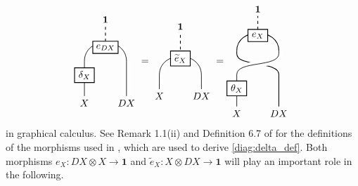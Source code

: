 \documentclass[11pt, reqno]{amsart}
\theoremstyle{definition}\newtheorem{defi}[thm]{Definition}
\theoremstyle{definition}\newtheorem{rem}[thm]{Remark}
\theoremstyle{definition}\newtheorem{exam}[thm]{Example}
\theoremstyle{definition}\newtheorem{assum}[thm]{Assumption}
\newcommand{\til}{\widetilde}
\newcommand{\vac}{\mathbf{1}}
\begin{document}
 \begin{equation*}
 \begin{matrix}
    \begin{tikzpicture}[scale = 1, baseline = {(current bounding box.center)}, line width=0.75pt] 
    \draw[white, double=black, line width = 3pt ] (0,0) -- (0,1.25) .. controls (0,2.15) and (1.5,2.15) .. (1.5,1.25) -- (1.5,0);
    \draw[dashed] (.75,1.75) -- (.75,2.5);
    \node at (0,-.25) {$X$};
    \node at (1.5,-.25) {$DX$};
    \node at (.75,2.75) {$\vac$};
    \node at (0,.75) [draw,minimum width=20pt,minimum height=10pt,thick, fill=white] {$\delta_X$};
    \node at (.75,1.75) [draw,minimum width=20pt,minimum height=10pt,thick, fill=white] {$e_{DX}$};
    \end{tikzpicture}
   \end{matrix} =
   \begin{matrix}
    \begin{tikzpicture}[scale = 1, baseline = {(current bounding box.center)}, line width=0.75pt] 
    \draw[white, double=black, line width = 3pt ] (0,0) -- (0,.5) .. controls (0,1.4) and (1.5,1.4) .. (1.5,.5) -- (1.5,0);
    \draw[dashed] (.75,1) -- (.75,2);
    \node at (0,-.25) {$X$};
    \node at (1.5,-.25) {$DX$};
    \node at (.75,2.25) {$\vac$};
    \node at (.75,1.1) [draw,minimum width=20pt,minimum height=10pt,thick, fill=white] {$\til{e}_{X}$};
    \end{tikzpicture}
   \end{matrix}
   =
  \begin{matrix}
    \begin{tikzpicture}[scale = 1, baseline = {(current bounding box.center)}, line width=0.75pt] 
    \draw (1.5,0) -- (1.5,1.15) .. controls (1.5,1.65) and (0,1.4) .. (0,1.9) -- (0,2);
    \draw[white, double=black, line width = 3pt ] (0,0) -- (0,1.15) .. controls (0,1.65) and (1.5,1.4) .. (1.5,1.9) -- (1.5,2);
    \draw (0,2) .. controls (0,2.85) and (1.5,2.85) .. (1.5,2);
    \draw[dashed] (.75,2.55) -- (.75,3.25);
    \node at (0,-.25) {$X$};
    \node at (1.5,-.25) {$DX$};
    \node at (.75,3.5) {$\vac$};
    \node at (0,.65) [draw,minimum width=20pt,minimum height=10pt,thick, fill=white] {$\theta_X$};
    \node at (.75,2.55) [draw,minimum width=20pt,minimum height=10pt,thick, fill=white] {$e_{X}$};
    \end{tikzpicture}
   \end{matrix}
\end{equation*}
in graphical calculus. See Remark 1.1(ii) and Definition 6.7 of \cite{BD} for the definitions of the morphisms used in \cite[Proposition 7.1]{BD}, which are used to derive \eqref{diag:delta_def}. Both morphisms $e_X: DX\otimes X\rightarrow\vac$ and $\til{e}_X: X\otimes DX\rightarrow\vac$ will play an important role in the following.
\end{document}
